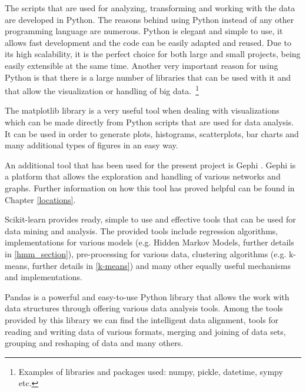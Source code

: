 The scripts that are used for analyzing, transforming and working with the data
are developed in Python. The reasons behind using Python instead of any other
programming language are numerous. Python is elegant and simple to use, it
allows fast development and the code can be easily adapted and reused. Due to
its high scalability, it is the perfect choice for both large and small
projects, being easily extensible at the same time. Another very important
reason for using Python is that there is a large number of libraries that can be
used with it and that allow the visualization or handling of big
data.~\footnote{Examples of libraries and packages used: numpy, pickle,
datetime, sympy etc.}

The matplotlib library \cite{Mplib} is a very useful tool when dealing with
visualizations which can be made directly from Python scripts that are used for
data analysis. It can be used in order to generate plots, histograms,
scatterplots, bar charts and many additional types of figures in an easy way.

An additional tool that has been used for the present project is Gephi
\cite{Gephi}. Gephi is a platform that allows the exploration and handling of
various networks and graphs. Further information on how this tool has proved
helpful can be found in Chapter \ref{locations}.

Scikit-learn \cite{SL} provides ready, simple to use and effective tools that
can be used for data mining and analysis. The provided tools include regression
algorithms, implementations for various models (e.g. Hidden Markov Models,
further details in \ref{hmm_section}), pre-processing for various data,
clustering algorithms (e.g. k-means, further details in \ref{k-means}) and many
other equally useful mechanisms and implementations.

Pandas \cite{Pandas} is a powerful and easy-to-use Python library that allows
the work with data structures through offering various data analysis tools.
Among the tools provided by this library we can find the intelligent data
alignment, tools for reading and writing data of various formats, merging and
joining of data sets, grouping and reshaping of data and many others.